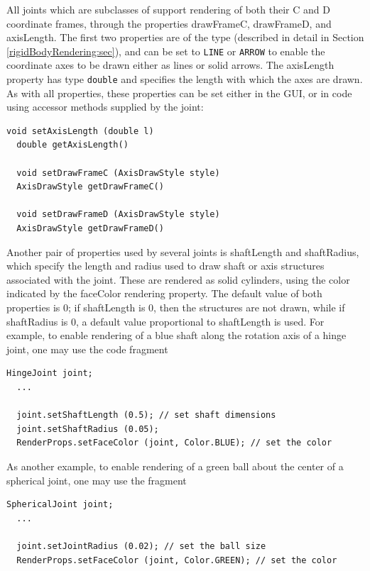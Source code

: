 All joints which are subclasses of
 support rendering of
both their C and D coordinate frames, through the properties {\sf
drawFrameC}, {\sf drawFrameD}, and {\sf axisLength}.  The first two
properties are of the type
 (described
in detail in Section \ref{rigidBodyRendering:sec}), and can be set to
{\tt LINE} or {\tt ARROW} to enable the coordinate axes to be drawn
either as lines or solid arrows. The {\sf axisLength} property has
type {\tt double} and specifies the length with which the axes are
drawn. As with all properties, these properties can be set either in
the GUI, or in code using accessor methods supplied by the joint:
\begin{lstlisting}[]
  void setAxisLength (double l)
  double getAxisLength()

  void setDrawFrameC (AxisDrawStyle style)
  AxisDrawStyle getDrawFrameC()

  void setDrawFrameD (AxisDrawStyle style)
  AxisDrawStyle getDrawFrameD()
\end{lstlisting}
%

Another pair of properties used by several joints is {\sf shaftLength}
and {\sf shaftRadius}, which specify the length and radius used to
draw shaft or axis structures associated with the joint.  These are
rendered as solid cylinders, using the color indicated by the {\sf
faceColor} rendering property.  The default value of both properties
is 0; if {\sf shaftLength} is 0, then the structures are not drawn,
while if {\sf shaftRadius} is 0, a default value proportional to {\sf
shaftLength} is used. For example, to enable rendering of a blue shaft
along the rotation axis of a hinge joint, one may use the code
fragment
%
\begin{lstlisting}[]
  HingeJoint joint;
  ...

  joint.setShaftLength (0.5); // set shaft dimensions
  joint.setShaftRadius (0.05);
  RenderProps.setFaceColor (joint, Color.BLUE); // set the color
\end{lstlisting}
%
As another example, to enable rendering of a green ball about the
center of a spherical joint, one may use the fragment
%
\begin{lstlisting}[]
  SphericalJoint joint;
  ...

  joint.setJointRadius (0.02); // set the ball size
  RenderProps.setFaceColor (joint, Color.GREEN); // set the color
\end{lstlisting}
%

